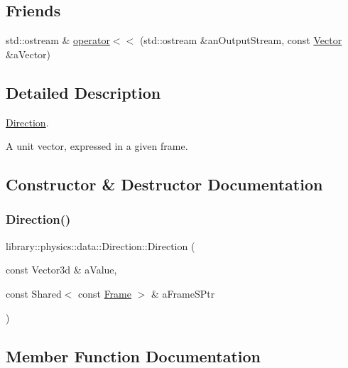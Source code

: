 \subsection*{Friends}
\begin{DoxyCompactItemize}
\item 
std\+::ostream \& \hyperlink{classlibrary_1_1physics_1_1data_1_1_direction_a2f1253dbad20965d2209456421eabf71}{operator$<$$<$} (std\+::ostream \&an\+Output\+Stream, const \hyperlink{classlibrary_1_1physics_1_1data_1_1_vector}{Vector} \&a\+Vector)
\end{DoxyCompactItemize}


\subsection{Detailed Description}
\hyperlink{classlibrary_1_1physics_1_1data_1_1_direction}{Direction}. 

A unit vector, expressed in a given frame. 

\subsection{Constructor \& Destructor Documentation}
\mbox{\label{classlibrary_1_1physics_1_1data_1_1_direction_a6adfdc25c23947ce94f801735544d812}} 
\subsubsection{\texorpdfstring{Direction()}{Direction()}}
{\footnotesize\ttfamily library\+::physics\+::data\+::\+Direction\+::\+Direction (\begin{DoxyParamCaption}\item[{const Vector3d \&}]{a\+Value,  }\item[{const Shared$<$ const \hyperlink{classlibrary_1_1physics_1_1coord_1_1_frame}{Frame} $>$ \&}]{a\+Frame\+S\+Ptr }\end{DoxyParamCaption})}



\subsection{Member Function Documentation}
\mbox{\label{classlibrary_1_1physics_1_1data_1_1_direction_af09f2a48292e271133fb05dc40462c78}} 

